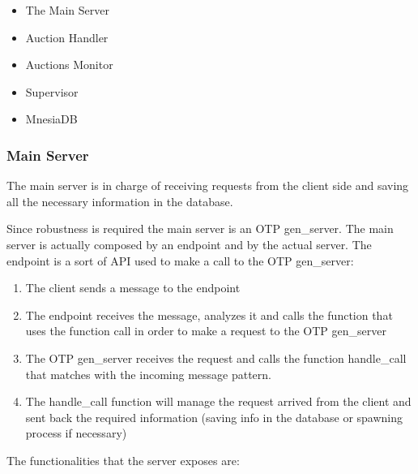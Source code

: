 \begin{itemize}
	\item The Main Server
	\item Auction Handler
	\item Auctions Monitor
	\item Supervisor
	\item MnesiaDB
\end{itemize}

\subsubsection{Main Server}
\noindent The main server is in charge of receiving requests from the client side and saving all the necessary information in the database.

\noindent Since robustness is required the main server is an OTP gen\_server. The main server is actually composed by an endpoint and by the actual server. The endpoint is a sort of API used to make a call to the OTP gen\_server:
\begin{enumerate}
	\item The client sends a message to the endpoint
	\item The endpoint receives the message, analyzes it and calls the function that uses the function call in order to make a request to the OTP gen\_server
	\item The OTP gen\_server receives the request and calls the function handle\_call that matches with the incoming message pattern.
	\item The handle\_call function will manage the request arrived from the client and sent back the required information (saving info in the database or spawning process if necessary)
\end{enumerate}
\noindent The functionalities that the server exposes are:
